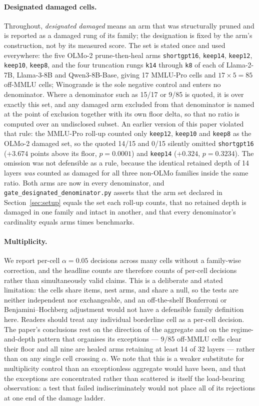 \paragraph{Designated damaged cells.} Throughout, \emph{designated damaged} means an arm that was structurally pruned and is reported as a damaged rung of its family; the designation is fixed by the arm's construction, not by its measured score. The set is stated once and used everywhere: the five OLMo-2 prune-then-heal arms \texttt{shortgpt16}, \texttt{keep14}, \texttt{keep12}, \texttt{keep10}, \texttt{keep8}, and the four truncation rungs \texttt{k14} through \texttt{k8} of each of Llama-2-7B, Llama-3-8B and Qwen3-8B-Base, giving 17 MMLU-Pro cells and $17\times5=85$ off-MMLU cells; Winogrande is the sole negative control and enters no denominator. Where a denominator such as 15/17 or 9/85 is quoted, it is over exactly this set, and any damaged arm excluded from that denominator is named at the point of exclusion together with its own floor delta, so that no ratio is computed over an undisclosed subset. An earlier version of this paper violated that rule: the MMLU-Pro roll-up counted only \texttt{keep12}, \texttt{keep10} and \texttt{keep8} as the OLMo-2 damaged set, so the quoted 14/15 and 0/15 silently omitted \texttt{shortgpt16} ($+3.674$ points above its floor, $p=0.0001$) and \texttt{keep14} ($+0.324$, $p=0.3234$). The omission was not defensible as a rule, because the identical retained depth of 14 layers \emph{was} counted as damaged for all three non-OLMo families inside the same ratio. Both arms are now in every denominator, and \texttt{gate\_designated\_denominator.py} asserts that the arm set declared in Section~\ref{sec:setup} equals the set each roll-up counts, that no retained depth is damaged in one family and intact in another, and that every denominator's cardinality equals arms times benchmarks.

\paragraph{Multiplicity.} We report per-cell $\alpha=0.05$ decisions across many cells without a family-wise correction, and the headline counts are therefore counts of per-cell decisions rather than simultaneously valid claims. This is a deliberate and stated limitation: the cells share items, nest arms, and share a null, so the tests are neither independent nor exchangeable, and an off-the-shelf Bonferroni or Benjamini--Hochberg adjustment would not have a defensible family definition here. Readers should treat any individual borderline cell as a per-cell decision. The paper's conclusions rest on the direction of the aggregate and on the regime-and-depth pattern that organises its exceptions --- 9/85 off-MMLU cells clear their floor and all nine are healed arms retaining at least 14 of 32 layers --- rather than on any single cell crossing $\alpha$. We note that this is a weaker substitute for multiplicity control than an exceptionless aggregate would have been, and that the exceptions are concentrated rather than scattered is itself the load-bearing observation: a test that failed indiscriminately would not place all of its rejections at one end of the damage ladder.

